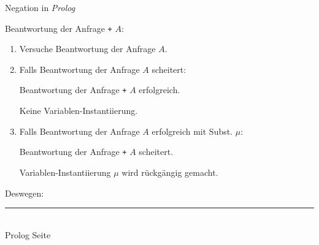 \documentclass{slides}
\newcommand{\myrule}{\rule{20cm}{1mm}\\ }
\newcounter{mypage}
\begin{document}
\begin{slide}{}
\normalsize
\begin{center}
Negation in \textsl{Prolog}
\end{center}
\vspace{0.5cm}

\footnotesize
Beantwortung der Anfrage \quad \texttt{+} $A$:
\begin{enumerate}
\item Versuche Beantwortung der Anfrage $A$.
\item Falls Beantwortung der Anfrage $A$ scheitert: 

      Beantwortung der Anfrage \texttt{+} $A$ erfolgreich.  

      Keine Variablen-Instantiierung.
\item Falls Beantwortung der Anfrage $A$ erfolgreich mit Subst. $\mu$:

      Beantwortung der Anfrage \texttt{+} $A$ scheitert.

      Variablen-Instantiierung $\mu$ wird rückgängig gemacht.
\end{enumerate}

Deswegen:




\vspace*{\fill}
\tiny \addtocounter{mypage}{1}
\myrule
Prolog  \hspace*{\fill} Seite 
\end{slide}

\end{document}
